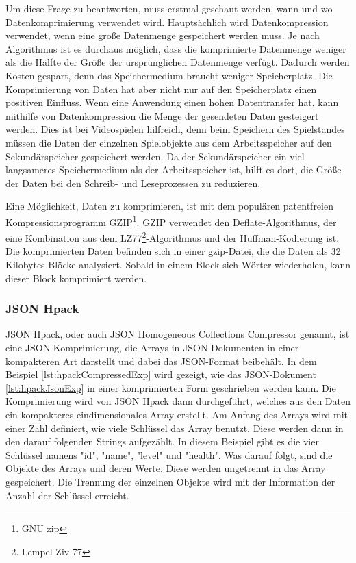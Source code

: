 Um diese Frage zu beantworten, muss erstmal geschaut werden, wann und wo Datenkomprimierung verwendet wird. Hauptsächlich wird Datenkompression verwendet, wenn eine große Datenmenge gespeichert werden muss. Je nach Algorithmus ist es durchaus möglich, dass die komprimierte Datenmenge weniger als die Hälfte der Größe der ursprünglichen Datenmenge verfügt. Dadurch werden Kosten gespart, denn das Speichermedium braucht weniger Speicherplatz. Die Komprimierung von Daten hat aber nicht nur auf den Speicherplatz einen positiven Einfluss. Wenn eine Anwendung einen hohen Datentransfer hat, kann mithilfe von Datenkompression die Menge der gesendeten Daten gesteigert werden. Dies ist bei Videospielen hilfreich, denn beim Speichern des Spielstandes müssen die Daten der einzelnen Spielobjekte aus dem Arbeitsspeicher auf den Sekundärspeicher gespeichert werden. Da der Sekundärspeicher ein viel langsameres Speichermedium als der Arbeitsspeicher ist, hilft es dort, die Größe der Daten bei den Schreib- und Leseprozessen zu reduzieren.\cite{mediumWhenDataCompression}

Eine Möglichkeit, Daten zu komprimieren, ist mit dem populären patentfreien Kompressionsprogramm GZIP\footnote{GNU zip}. GZIP verwendet den Deflate-Algorithmus, der eine Kombination aus dem  LZ77\footnote{Lempel-Ziv 77}-Algorithmus und der Huffman-Kodierung ist. Die komprimierten Daten befinden sich in einer gzip-Datei, die die Daten als 32 Kilobytes Blöcke analysiert. Sobald in einem Block sich Wörter wiederholen, kann dieser Block komprimiert werden. \cite{gnuGzip}\cite{1414952}\cite{seobilityGzipFunktioniert}

\subsubsection{JSON Hpack}
JSON Hpack, oder auch JSON Homogeneous Collections Compressor genannt, ist eine JSON-Komprimierung, die Arrays in JSON-Dokumenten in einer kompakteren Art darstellt und dabei das JSON-Format beibehält. In dem Beispiel \ref{lst:hpackCompressedExp} wird gezeigt, wie das JSON-Dokument \ref{lst:hpackJsonExp} in einer komprimierten Form geschrieben werden kann. Die Komprimierung wird von JSON Hpack dann durchgeführt, welches aus den Daten ein kompakteres eindimensionales Array erstellt. Am Anfang des Arrays wird mit einer Zahl definiert, wie viele Schlüssel das Array benutzt. Diese werden dann in den darauf folgenden Strings aufgezählt. In diesem Beispiel gibt es die vier Schlüssel namens "id", "name", "level" und "health". Was darauf folgt, sind die Objekte des Arrays und deren Werte. Diese werden ungetrennt in das Array gespeichert. Die Trennung der einzelnen Objekte wird mit der Information der Anzahl der Schlüssel erreicht.
\cite{webreflectionLastVersion}


